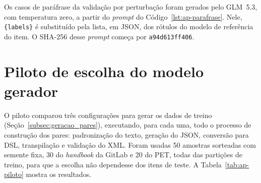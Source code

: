 \begin{apendicesenv}








Os casos de paráfrase da validação por perturbação foram gerados pelo GLM~5.3, com temperatura zero, a partir do \textit{prompt} do Código~\ref{lst:ap-parafrase}. Nele, \texttt{\{labels\}} é substituído pela lista, em JSON, dos rótulos do modelo de referência do item. O SHA-256 desse \textit{prompt} começa por \texttt{a94d613ff406}.



\chapter{Piloto de escolha do modelo gerador}\label{ap:piloto-gerador}

O piloto comparou três configurações para gerar os dados de treino (Seção~\ref{subsec:geracao_pares}), executando, para cada uma, todo o processo de construção dos pares: padronização do texto, geração do JSON, conversão para DSL, transpilação e validação do XML. Foram usadas 50 amostras sorteadas com semente fixa, 30 do \textit{handbook} da GitLab e 20 do PET, todas das partições de treino, para que a escolha não dependesse dos itens de teste. A Tabela~\ref{tab:ap-piloto} mostra os resultados.

\begin{table}[htb]
\end{table}


\end{apendicesenv}
